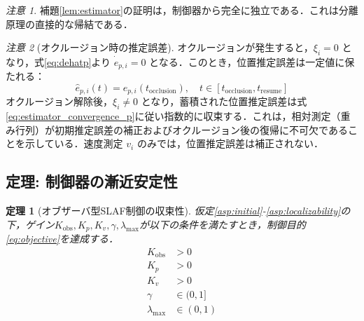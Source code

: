 \documentclass[a4paper]{jarticle}
\newtheorem{theorem}{定理}[section]
\theoremstyle{definition}
\theoremstyle{remark}
\newtheorem{remark}{注意}[section]
\numberwithin{equation}{section}
\begin{document}
	\begin{remark}
		補題\ref{lem:estimator}の証明は，制御器から完全に独立である．これは分離原理の直接的な帰結である．
	\end{remark}
	
	\begin{remark}[オクルージョン時の推定誤差]
		オクルージョンが発生すると，$\xi_i = 0$ となり，式\eqref{eq:dehatp}より $\dot{\hat{e}}_{p,i} = 0$ となる．このとき，位置推定誤差は一定値に保たれる：
		\begin{equation}
			\hat{e}_{p,i}(t) = \hat{e}_{p,i}(t_{\text{occlusion}}), \quad t \in [t_{\text{occlusion}}, t_{\text{resume}}]
		\end{equation}
		オクルージョン解除後，$\xi_i \neq 0$ となり，蓄積された位置推定誤差は式\eqref{eq:estimator_convergence_p}に従い指数的に収束する．これは，相対測定（重み行列）が初期推定誤差の補正およびオクルージョン後の復帰に不可欠であることを示している．速度測定 $v_i$ のみでは，位置推定誤差は補正されない．
	\end{remark}
	
	\subsection{定理: 制御器の漸近安定性}
	
	\begin{screen}
		\begin{theorem}[オブザーバ型SLAF制御の収束性]
			仮定\ref{asp:initial}-\ref{asp:localizability}の下，ゲイン$K_{\mathrm{obs}}, K_p, K_v, \gamma, \lambda_{\max}$が以下の条件を満たすとき，制御目的\eqref{eq:objective}を達成する．
			\begin{align}
				K_{\mathrm{obs}} &> 0 \label{eq:gain1}\\
				K_p &> 0 \label{eq:gain2}\\
				K_v &> 0 \label{eq:gain3}\\
				\gamma &\in (0, 1] \label{eq:gain4}\\
				\lambda_{\max} &\in (0, 1) \label{eq:gain5}
			\end{align}
			\label{thm:main}
		\end{theorem}
	\end{screen}
	
\end{document}
